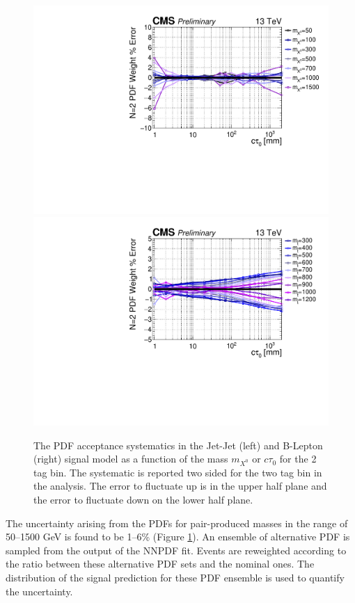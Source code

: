 \begin{figure}
\begin{center}
\includegraphics[width=.70\textwidth]{figures/an/SYSTEMATICS/76x_pu/sys_2tag_pdf.pdf}
\includegraphics[width=.70\textwidth]{figures/an/SYSTEMATICS/76x_pu/sys_2tag_pdf_dsusy.pdf}
\caption{The PDF acceptance  systematics in the Jet-Jet (left)
 and B-Lepton (right) signal model as a function of the mass $m_{X^0}$ 
or $c\tau_0$ for the 2 tag bin. The systematic is reported two sided 
for the two tag bin in the analysis. The error to fluctuate up is in
 the upper half plane and the error to fluctuate down on the lower half plane.  \label{fig:pdf_sys}}
\end{center}
\end{figure}

The uncertainty arising from the PDFs for pair-produced masses in the
range of 50--1500 GeV is found to be 1--6\% (Figure \ref{fig:pdf_sys}).  An ensemble of
alternative PDF is sampled from the output of the NNPDF fit.  Events
are reweighted according to the ratio between these alternative PDF
sets and the nominal ones. The distribution of the signal prediction
for these PDF ensemble is used to quantify the uncertainty.

